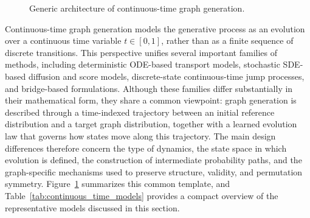 \documentclass{article}
\begin{document}
\begin{figure}[!htbp]
\caption{Generic architecture of continuous-time graph generation.}
\label{fig:generic_continuous_time_architecture}
\end{figure}

Continuous-time graph generation models the generative process as an evolution over a continuous time variable $t \in [0,1]$, rather than as a finite sequence of discrete transitions. This perspective unifies several important families of methods, including deterministic ODE-based transport models, stochastic SDE-based diffusion and score models, discrete-state continuous-time jump processes, and bridge-based formulations. Although these families differ substantially in their mathematical form, they share a common viewpoint: graph generation is described through a time-indexed trajectory between an initial reference distribution and a target graph distribution, together with a learned evolution law that governs how states move along this trajectory. The main design differences therefore concern the type of dynamics, the state space in which evolution is defined, the construction of intermediate probability paths, and the graph-specific mechanisms used to preserve structure, validity, and permutation symmetry. Figure~\ref{fig:generic_continuous_time_architecture} summarizes this common template, and Table~\ref{tab:continuous_time_models} provides a compact overview of the representative models discussed in this section.
\end{document}
